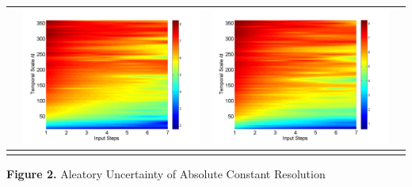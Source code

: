 \documentclass[review]{elsarticle}
\begin{document}
\begin{table}[H]
\begin{tabular}{cccc}
&\begin{minipage}{.3\textwidth}\includegraphics[width=\linewidth]{resultgraph/06810000pep_abs.png}\end{minipage}
&\begin{minipage}{.3\textwidth}\includegraphics[width=\linewidth]{resultgraph/06810000pepq_abs.png}\end{minipage}
\\
\hline
\\
\end{tabular}

\Large{\textbf{Figure 2.} Aleatory Uncertainty of Absolute Constant Resolution}
\end{table}
\end{document}
